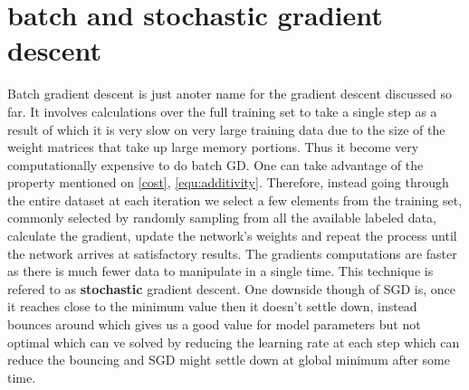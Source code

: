\section{batch and stochastic gradient descent}

Batch gradient descent is just anoter name for the gradient descent discussed so far. It involves calculations over the full training set to take a single step as a result of which it is very slow on very large training data due to the size of the weight matrices that take up large memory portions. Thus it become very computationally expensive to do batch GD. One can take advantage of the property mentioned on \cref{cost}, \cref{equ:additivity}. Therefore, instead going through the entire dataset at each iteration we select a few elements from the
training set, commonly selected by randomly sampling from all the available labeled data, calculate the gradient, update the network's weights and repeat the process until the network arrives at satisfactory results. The gradients computations are faster as there is much fewer data to manipulate in a single time. This technique is refered to as \textbf{stochastic} gradient descent. One downside though of SGD is, once it reaches close to the minimum value then it doesn’t settle down, instead bounces around which gives us a good value for model parameters but not optimal which can ve solved by reducing the learning rate at each step which can reduce the bouncing and SGD might settle down at global minimum after some time.
